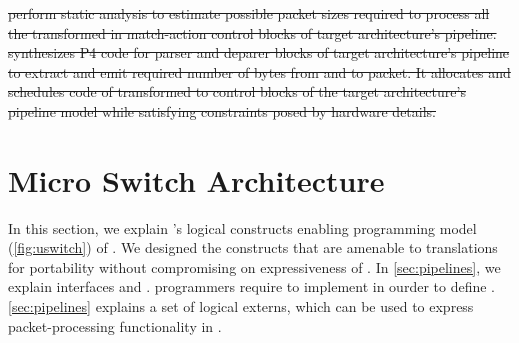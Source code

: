 \documentclass[letterpaper,twocolumn,10pt]{article}
\begin{document}
\sout{\ucomp perform static analysis to estimate possible packet 
sizes required to process all the transformed \uprograms in 
match-action control blocks of target architecture's pipeline.
\ucomp synthesizes P4 code for parser and deparer blocks of target architecture's pipeline to extract and emit required number of bytes from and to packet.
It allocates and schedules code of transformed \uprograms to control 
blocks of the target architecture's pipeline model while satisfying 
constraints posed by hardware details.}

\section{Micro Switch Architecture}
\label{sec:architecture}
In this section, we explain \uarch's logical constructs enabling
programming model (\cref{fig:uswitch}) of \uswitch. We designed 
the constructs that are amenable to \ucomp translations for 
portability without compromising on expressiveness of \uprograms. In 
\cref{sec:pipelines}, we explain interfaces and \upipelines.
programmers require to implement in ourder to define \upackages. 
\cref{sec:pipelines} explains a set of logical externs, which can be 
used to express packet-processing functionality in \upackages.
\end{document}
